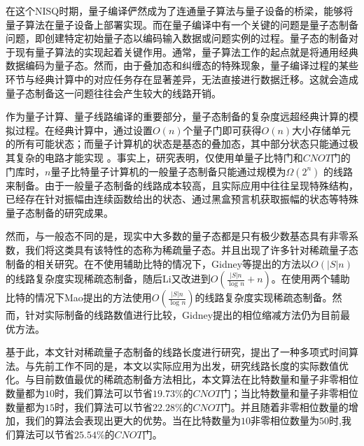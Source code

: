 \documentclass[10.5pt,compsoc,UTF8]{CjC}
\theoremstyle{mystyle}
\begin{document}
在这个NISQ时期，量子编译俨然成为了连通量子算法与量子设备的桥梁，能够将量子算法在量子设备上部署实现。而在量子编译中有一个关键的问题是量子态制备问题，即创建特定初始量子态以编码输入数据或问题实例的过程。量子态的制备对于现有量子算法的实现起着关键作用。通常，量子算法工作的起点就是将通用经典数据编码为量子态。然而，由于叠加态和纠缠态的特殊现象，量子编译过程的某些环节与经典计算中的对应任务存在显著差异，无法直接进行数据迁移。这就会造成量子态制备这一问题往往会产生较大的线路开销。

作为量子计算、量子线路编译的重要部分，量子态制备的复杂度远超经典计算的模拟过程\cite{aaronson2004multilinear}。在经典计算中，通过设置$O\left ( n \right ) $个量子门即可获得$O\left ( n \right ) $大小存储单元的所有可能状态；而量子计算机的状态是基态的叠加态，其中部分状态只能通过极其复杂的电路才能实现\cite{knill1995approximation, mottonen2004transformation} 。事实上，研究表明，仅使用单量子比特门和$CNOT$门的门库时，$n$量子比特量子计算机的一般量子态制备只能通过规模为$\Omega \left ( 2^n \right ) $\cite{knill1995approximation, mottonen2004transformation} 的线路来制备。由于一般量子态制备的线路成本较高，且实际应用中往往呈现特殊结构，已经存在针对振幅由连续函数给出的状态、通过黑盒预言机获取振幅的状态等特殊量子态\cite{bausch2022fast, gonzalez2024efficient, holmes2020efficient, marin2023quantum, rattew2022preparing, sanders2019black}制备的研究成果。

然而，与一般态不同的是，现实中大多数的量子态都是只有极少数基态具有非零系数，我们将这类具有该特性的态称为稀疏量子态。并且出现了许多针对稀疏量子态制备的相关研究。在不使用辅助比特的情况下，Gidney等\cite{gleinig2021efficient, malvetti2021quantum}提出的方法以$O\left ( \left |  S\right | n \right ) $的线路复杂度实现稀疏态制备，随后Li\cite{li2024nearly}又改进到$O\left (  \frac{\left |  S\right | n}{\log_{}{n} } + n\right) $。在使用两个辅助比特的情况下Mao\cite{mao2024toward}提出的方法使用$O\left (  \frac{\left |  S\right | n}{\log_{}{n} } \right) $的线路复杂度实现稀疏态制备。然而，针对实际制备的线路数值进行比较，Gidney\cite{gleinig2021efficient}提出的相位缩减方法仍为目前最优方法。

基于此，本文针对稀疏量子态制备的线路长度进行研究，提出了一种多项式时间算法。与先前工作不同的是，本文以实际应用为出发，研究线路长度的实际数值优化。与目前数值最优的稀疏态制备方法\cite{gleinig2021efficient}相比，本文算法在比特数量和量子非零相位数量都为$10$时，我们算法可以节省$19.73\%$的$CNOT$门；当比特数量和量子非零相位数量都为$15$时，我们算法可以节省$22.28\%$的$CNOT$门。并且随着非零相位数量的增加，我们的算法会表现出更大的优势。当在比特数量为$10$非零相位数量为$50$时,我们算法可以节省$25.54\%$的$CNOT$门。
\end{document}
